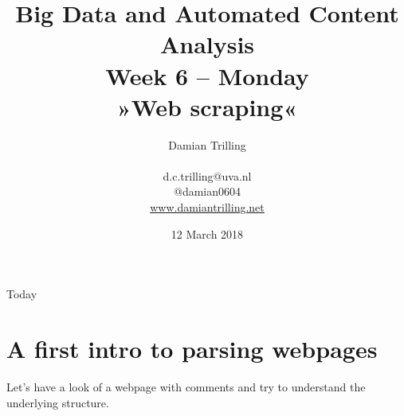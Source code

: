 \documentclass{beamer}
\begin{document}
\title[Big Data  and Automated Content Analysis]{\textbf{Big Data  and Automated Content Analysis} \\ Week 6 -- Monday\\ »Web scraping«}
\author[Damian Trilling]{Damian Trilling \\ ~ \\ \footnotesize{d.c.trilling@uva.nl \\@damian0604} \\ \url{www.damiantrilling.net}}
\date{12 March 2018}

\begin{frame}{}
\titlepage
\end{frame}

\begin{frame}{Today}
\tableofcontents
\end{frame}



\section{A first intro to parsing webpages}

\begin{frame}
Let's have a look of a webpage with comments and try to understand the underlying structure.
\end{frame}
\end{document}
